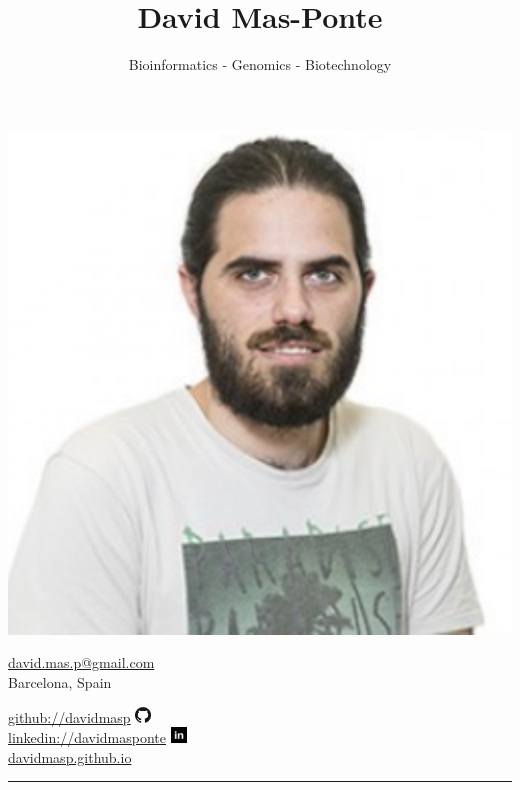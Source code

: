 \documentclass[10pt,a4paper]{article} %
\title{\bfseries\Huge David Mas-Ponte}
\author{Bioinformatics - Genomics - Biotechnology}
\date{}
\begin{document}
\begin{minipage}[c]{0.65\textwidth}
\maketitle
\end{minipage}
\begin{minipage}[c]{0.3\textwidth}
  \includegraphics[width=.55\textwidth]{profile}
\end{minipage}


\begin{minipage}[c]{0.65\textwidth}
  \begin{center}
    \href{mailto:david.mas.p@gmail.com}{david.mas.p@gmail.com}\\
    Barcelona, Spain
  \end{center}
\end{minipage}
\begin{minipage}[c]{0.3\textwidth}
\href{https://github.com/davidmasp}{github://davidmasp}
\includegraphics[height=12pt]{gh}\\
\href{https://www.linkedin.com/in/davidmasponte/}{linkedin://davidmasponte}
\includegraphics[height=12pt]{in}\\
\href{https://davidmasp.github.io}{davidmasp.github.io}
\end{minipage}


\vspace{0.75cm}
\rule{.95\textwidth}{0.6pt}

\end{document}
